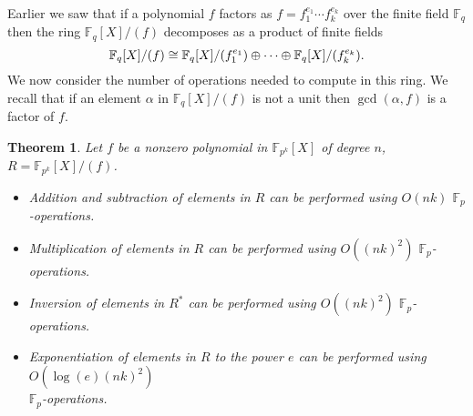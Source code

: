 \documentclass{article}
\let\originalleft\left
\let\originalright\right
\renewcommand{\left}{\mathopen{}\mathclose\bgroup\originalleft}
\renewcommand{\right}{\aftergroup\egroup\originalright}
\newcounter{dummy} \numberwithin{dummy}{section}
\theoremstyle{plain}
\newtheorem{thm}[dummy]{Theorem}
\theoremstyle{definition}
\def\Fp {{ \mathbb{F} _ {p} }}
\def\Fq {{ \mathbb{F} _ {q} }}
\def\FpE {{ \mathbb{F} _ {p^k} }}
\begin{document}
		Earlier we saw that if a polynomial $f$ factors as $f=f_1^{e_1} \cdots f_k^{e_k}$ over the finite field $\Fq$ then the ring $\Fq[X]/(f)$ decomposes as a product of finite fields
		\[\Fq[X]/(f) \cong \Fq[X]/\left(f_1^{e_1}\right) \oplus \cdots \oplus \Fq[X]/\left(f_k^{e_k}\right). \]
		We now consider the number of operations needed to compute in this ring. We recall that if an element $\alpha$ in $\Fq[X]/(f)$ is not a unit then $\gcd(\alpha,f)$ is a factor of $f$. 
		
		\begin{thm} 
		\label{THM:runTimes}
		    Let $f$ be a nonzero polynomial in $\FpE[X]$ of degree $n$, $R =\FpE[X]/(f)$. 
				\begin{itemize}
		        \item Addition and subtraction of elements in $R$ can be performed using $O(nk)$ $\Fp$-operations. 
		        \item Multiplication of elements in $R$ can be performed using $O(( nk )^2)$ $\Fp$-operations. 
		        \item Inversion of elements in $R^{*}$ can be performed using $O(( nk )^2)$ $\Fp$-operations. 
		        \item Exponentiation of elements in $R$ to the power $e$ can be performed using $O(\log(e)(nk)^2)$ \\
						$\Fp$-operations.
				\end{itemize}
		\end{thm}
		
\end{document}
